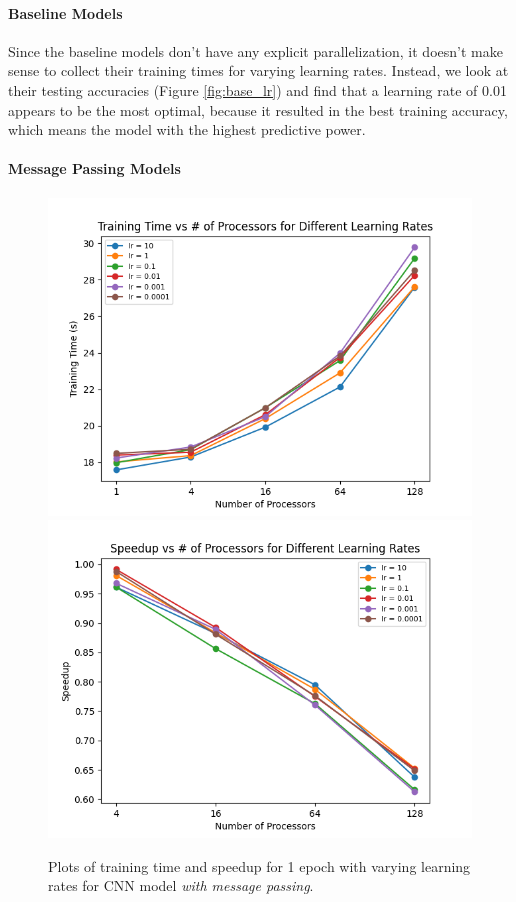 \documentclass{article}
\begin{document}
\paragraph{Baseline Models}

Since the baseline models don't have any explicit parallelization, it doesn't make sense to collect their training times for varying learning rates. Instead, we look at their testing accuracies (Figure \ref{fig:base_lr}) and find that a learning rate of 0.01 appears to be the most optimal, because it resulted in the best training accuracy, which means the model with the highest predictive power.

\paragraph{Message Passing Models}

\begin{figure}[!h]
    \centering
    \includegraphics[scale=0.5]{cnn_mpi_lr_time}
    \includegraphics[scale=0.5]{cnn_mpi_lr_speed}
    \caption{Plots of training time and speedup for 1 epoch with varying learning rates for CNN model \textit{with message passing}.}
    \label{fig:cnn_lr}
\end{figure}
\end{document}

